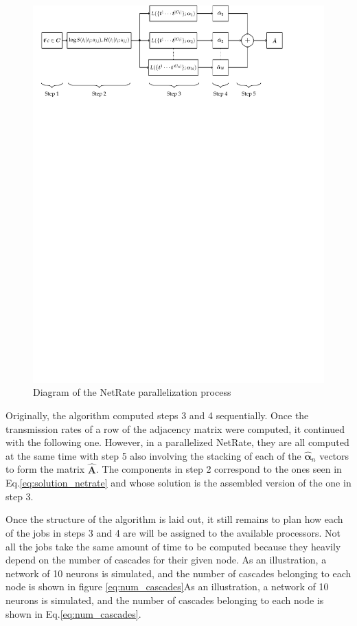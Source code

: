 \documentclass[11pt]{article}
\begin{document}
\begin{figure}[H]
	\centering
	\includegraphics[trim={0 21cm 0 0}, width=\linewidth]{diagram_parallelization.pdf}
  \caption{Diagram of the NetRate parallelization process} 
	\label{fig:diagram_parallelization}
\end{figure}

Originally, the algorithm computed steps 3 and 4 sequentially. Once the transmission rates of a row of the adjacency matrix were computed, it continued with the following one. However, in a parallelized NetRate, they are all computed at the same time with step 5 also involving the stacking of each of the \(\bm{\hat{\alpha}}_{n}\) vectors to form the matrix \(\bm{\hat{A}}\).
The components in step 2 correspond to the ones seen in Eq.\ref{eq:solution_netrate} and whose solution is the assembled version of the one in step 3.

Once the structure of the algorithm is laid out, it still remains to plan how each of the jobs in steps 3 and 4 are will be assigned to the available processors. Not all the jobs take the same amount of time to be computed because they heavily depend on the number of cascades for their given node. As an illustration, a network of 10 neurons is simulated, and the number of cascades belonging to each node is shown in figure \ref{eq:num_cascades}As an illustration, a network of 10 neurons is simulated, and the number of cascades belonging to each node is shown in Eq.\ref{eq:num_cascades}. 
\end{document}
